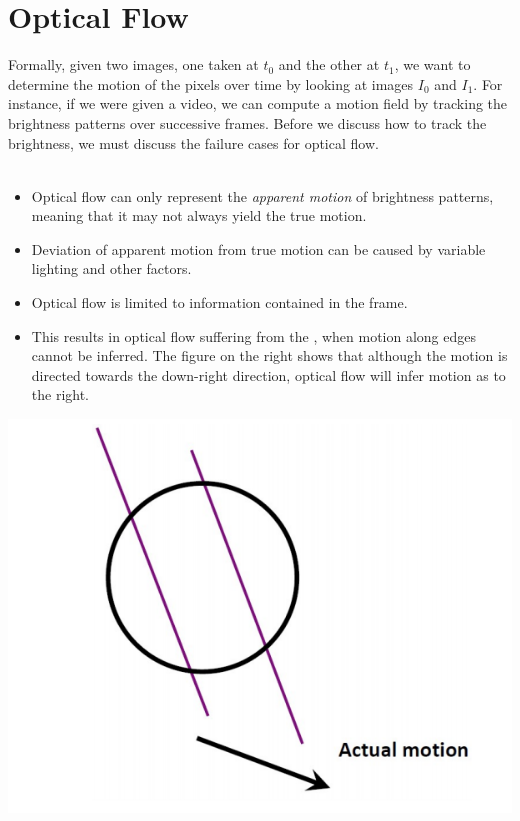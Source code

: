 \documentclass{article}
\begin{document}
\section{Optical Flow}
Formally, given two images, one taken at $t_0$ and the other at $t_1$, we want to determine the motion of the pixels over time by looking at images $I_0$ and $I_1$. For instance, if we were given a video, we can compute a motion field by tracking the brightness patterns over successive frames. Before we discuss how to track the brightness, we must discuss the failure cases for optical flow. 
\\ \\
\begin{minipage}{.65\textwidth}
    \begin{itemize}
    \item Optical flow can only represent the \textit{apparent motion} of brightness patterns, meaning that it may not always yield the true motion.
    \item Deviation of apparent motion from true motion can be caused by variable lighting and other factors.
    \item Optical flow is limited to information contained in the frame.
    \item This results in optical flow suffering from the , when motion along edges cannot be inferred. The figure on the right shows that although the motion is directed towards the down-right direction, optical flow will infer motion as to the right.
    \end{itemize}
\end{minipage}
\begin{minipage}{.35\textwidth}
\begin{center}
    \vspace{10pt}
    \includegraphics[width=1\textwidth]{apectureprob.png}
  \end{center}
\end{minipage}
\end{document}
